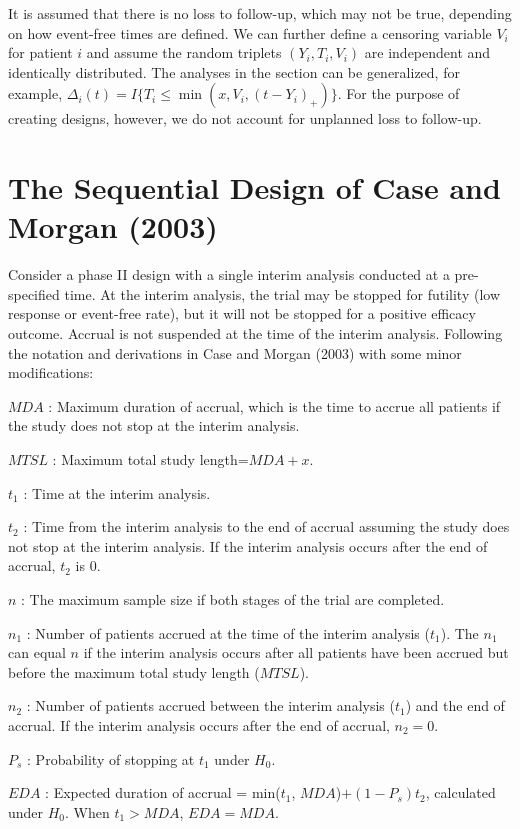 \documentclass[12pt]{article}
\begin{document}
It is assumed that there is no loss to follow-up, which may not be true, depending on how
event-free times are defined. We can further define a
censoring variable $V_i$ for patient $i$ and assume the random triplets $(Y_i, T_i, V_i)$ are
independent and identically distributed. The analyses in the section can be generalized, for
example, $\Delta_i(t)=I\{T_i\leq \min(x, V_i, (t-Y_i)_+)\}$. For the purpose of creating designs,
however, we do not account for unplanned loss to follow-up.

\section{The Sequential Design of Case and Morgan (2003)}
\label{excmdes}

Consider a phase II design with a single interim analysis conducted at a pre-specified time.
At the interim analysis, the trial may be stopped for futility (low response or event-free rate),
but it will not be stopped for a positive efficacy outcome.  Accrual is not suspended at the time of the interim analysis.  Following the notation and
derivations in Case and Morgan (2003) with some minor modifications: \vskip 24pt

\noindent $MDA$ : Maximum duration of accrual, which is the time to accrue all patients if the
study does not stop at the interim analysis.

\noindent $MTSL$ : Maximum total study length=$MDA+x$.

\noindent $t_1$ : Time at the interim analysis.

\noindent $t_2$ : Time from the interim analysis to the end of accrual assuming the study does not
stop at the interim analysis.  If the interim analysis occurs after the end of accrual, $t_2$ is $0$.

\noindent $n$ :  The maximum sample size if both stages of the trial are completed.

\noindent $n_1$ : Number of patients accrued at the time of the interim analysis ($t_1$). The $n_1$ can
equal $n$ if the interim analysis occurs after all patients have been accrued but before the
maximum total study length ($MTSL$).

\noindent $n_2$ : Number of patients accrued between the interim analysis ($t_1$) and the end of
accrual. If the interim analysis occurs after the end of accrual, $n_2=0$.

\noindent $P_s$ : Probability of stopping at $t_1$ under $H_0$.

\noindent $EDA$ : Expected duration of accrual = min($t_1$, $MDA$)$+(1-P_s)t_2$, calculated under
$H_0$.  When $t_1>MDA$, $EDA=MDA$.
\end{document}
